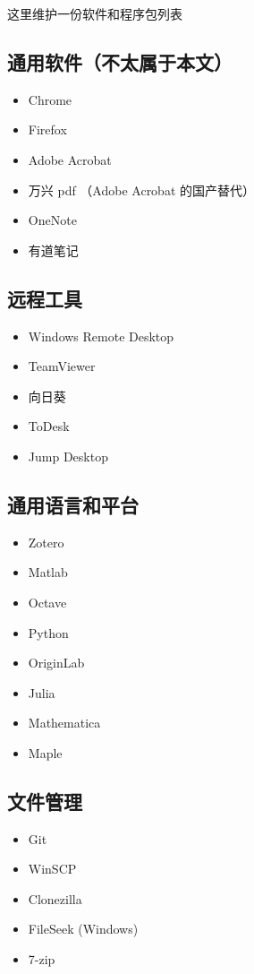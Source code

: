 
\begin{issues}
\issueDraft
{}
\end{issues}

这里维护一份软件和程序包列表

\subsection{通用软件（不太属于本文）}
\begin{itemize}
\item Chrome
\item Firefox
\item Adobe Acrobat
\item 万兴 pdf （Adobe Acrobat 的国产替代）
\item OneNote
\item 有道笔记
\end{itemize}

\subsection{远程工具}
\begin{itemize}
\item Windows Remote Desktop
\item TeamViewer
\item 向日葵
\item ToDesk
\item Jump Desktop
\end{itemize}

\subsection{通用语言和平台}
\begin{itemize}
\item Zotero
\item Matlab
\item Octave
\item Python
\item OriginLab
\item Julia
\item Mathematica
\item Maple
\end{itemize}

\subsection{文件管理}
\begin{itemize}
\item Git
\item WinSCP
\item Clonezilla
\item FileSeek (Windows)
\item 7-zip
\end{itemize}

